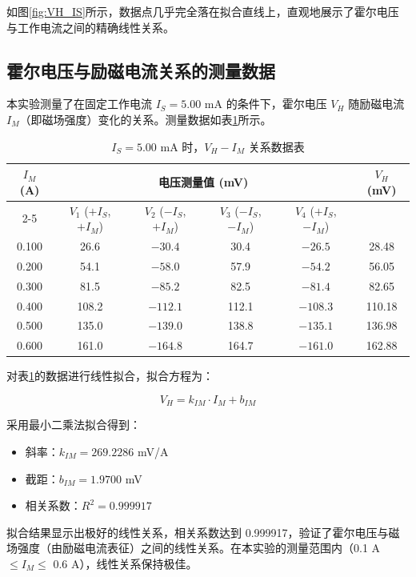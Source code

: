 ﻿\documentclass[12pt,a4paper]{article}
\begin{document}
如图\ref{fig:VH_IS}所示，数据点几乎完全落在拟合直线上，直观地展示了霍尔电压与工作电流之间的精确线性关系。

\subsection{霍尔电压与励磁电流关系的测量数据}

本实验测量了在固定工作电流 $I_S = 5.00$ mA 的条件下，霍尔电压 $V_H$ 随励磁电流 $I_M$（即磁场强度）变化的关系。测量数据如表\ref{tab:VH_IM}所示。

\begin{table}[H]
\centering
\caption{$I_S = 5.00$ mA 时，$V_H - I_M$ 关系数据表}
\label{tab:VH_IM}
\begin{tabular}{|c|c|c|c|c|c|}
\hline
\multirow{2}{*}{$I_M$ (A)} & \multicolumn{4}{c|}{电压测量值 (mV)} & \multirow{2}{*}{$V_H$ (mV)} \\
\cline{2-5}
& $V_1$ ($+I_S$, $+I_M$) & $V_2$ ($-I_S$, $+I_M$) & $V_3$ ($-I_S$, $-I_M$) & $V_4$ ($+I_S$, $-I_M$) & \\
\hline
0.100 & 26.6 & $-30.4$ & 30.4 & $-26.5$ & 28.48 \\
\hline
0.200 & 54.1 & $-58.0$ & 57.9 & $-54.2$ & 56.05 \\
\hline
0.300 & 81.5 & $-85.2$ & 82.5 & $-81.4$ & 82.65 \\
\hline
0.400 & 108.2 & $-112.1$ & 112.1 & $-108.3$ & 110.18 \\
\hline
0.500 & 135.0 & $-139.0$ & 138.8 & $-135.1$ & 136.98 \\
\hline
0.600 & 161.0 & $-164.8$ & 164.7 & $-161.0$ & 162.88 \\
\hline
\end{tabular}
\end{table}

对表\ref{tab:VH_IM}的数据进行线性拟合，拟合方程为：

\begin{equation}
V_H = k_{IM} \cdot I_M + b_{IM}
\end{equation}

采用最小二乘法拟合得到：
\begin{itemize}
    \item 斜率：$k_{IM} = 269.2286$ mV/A
    \item 截距：$b_{IM} = 1.9700$ mV
    \item 相关系数：$R^2 = 0.999917$
\end{itemize}

拟合结果显示出极好的线性关系，相关系数达到 0.999917，验证了霍尔电压与磁场强度（由励磁电流表征）之间的线性关系。在本实验的测量范围内（0.1 A $\leq I_M \leq$ 0.6 A），线性关系保持极佳。
\end{document}
